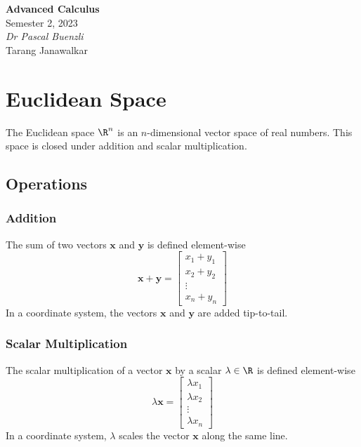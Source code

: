 \documentclass{article}
\date{}
\newcommand{\unitName}{Advanced Calculus}
\newcommand{\unitTime}{Semester 2, 2023}
\newcommand{\unitCoordinator}{Dr Pascal Buenzli}
\newcommand{\documentAuthors}{Tarang Janawalkar}
\begin{document}
%
\begin{titlepage}
    \vspace*{\fill}
    \begin{center}
        \LARGE{\textbf{\unitName}} \\[0.1in]
        \normalsize{\unitTime} \\[0.2in]
        \normalsize\textit{\unitCoordinator} \\[0.2in]
        \documentAuthors
    \end{center}
    \vspace*{\fill}
    \doclicenseThis
    \thispagestyle{empty}
\end{titlepage}
\newpage
%
\tableofcontents
\newpage
%
\section{Euclidean Space}
The Euclidean space \(\R^n\) is an \(n\)-dimensional vector space of
real numbers. This space is closed under addition and scalar
multiplication.
\subsection{Operations}
\subsubsection{Addition}
The sum of two vectors \(\symbf{x}\) and \(\symbf{y}\) is defined
element-wise
\begin{equation*}
    \symbf{x} + \symbf{y} =
    \begin{bmatrix}
        x_1 + y_1 \\
        x_2 + y_2 \\
        \vdots    \\
        x_n + y_n
    \end{bmatrix}
\end{equation*}
In a coordinate system, the vectors \(\symbf{x}\) and \(\symbf{y}\) are added tip-to-tail.
\subsubsection{Scalar Multiplication}
The scalar multiplication of a vector \(\symbf{x}\) by a scalar
\(\lambda \in \R\) is defined element-wise
\begin{equation*}
    \lambda \symbf{x} =
    \begin{bmatrix}
        \lambda x_1 \\
        \lambda x_2 \\
        \vdots      \\
        \lambda x_n
    \end{bmatrix}
\end{equation*}
In a coordinate system, \(\lambda\) scales the vector \(\symbf{x}\) along the same line.
\end{document}
